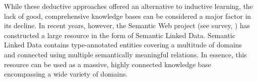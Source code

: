 \documentclass[twoside,11pt]{article}
\theoremstyle{definition}
\begin{document}

While these deductive approaches offered an alternative to inductive learning, the lack of good, comprehensive knowledge bases can be considered a major factor in its decline.
In recent years, however, the Semantic Web project (see survey, ) has constructed a large resource in the form of Semantic Linked Data. Semantic Linked Data contains type-annotated entities covering a multitude of domains and connected using multiple semantically meaningful relations. In essence, this resource can be used as a massive, highly connected knowledge base encompassing a wide variety of domains.


\end{document}
